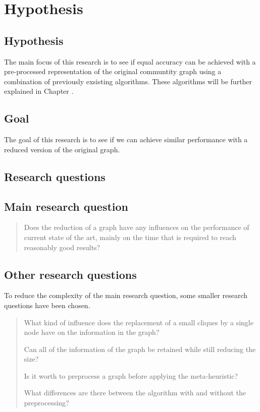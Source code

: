 \section{Hypothesis}
\label{sec:hypothesis}

\subsection{Hypothesis}
The main focus of this research is to see if equal accuracy can be achieved with a pre-processed representation of the original communtity graph using a combination of previously exsisting algorithms.
These algorithms will be further explained in Chapter \cite{chapter:relevantResearch}.


\subsection{Goal}
The goal of this research is to see if we can achieve similar performance with a reduced version of the original graph.


\subsection{Research questions}
\subsection*{Main research question}
\begin{quote}
Does the reduction of a graph have any influences on the performance of current state of the art, mainly on the time that is required to reach reasonably good results?
\end{quote}
\subsection*{Other research questions}
To reduce the complexity of the main research question, some smaller research questions have been chosen.
\begin{quote}
What kind of influence does the replacement of a small cliques by a single node have on the information in the graph?

Can all of the information of the graph be retained while still reducing the size?

Is it worth to preprocess a graph before applying the meta-heuristic?

What differences are there between the algorithm with and without the preprocessing?
\end{quote}
